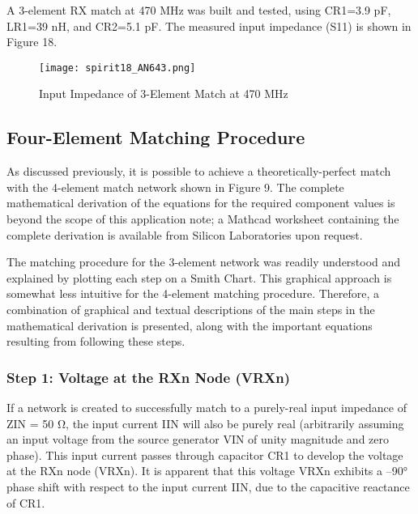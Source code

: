         A 3-element RX match at 470 MHz was built and tested, using CR1=3.9 pF, LR1=39 nH, and 
        CR2=5.1 pF. The measured input impedance (S11) is shown in Figure 18.
        
        \begin{figure}[ht!] %
          \centering
          \texttt{[image: spirit18\_AN643.png]}
          \caption{Input Impedance of 3-Element Match at 470 MHz \cite[s.~14]{AN643SiliconLabs}}
          \label{EXP001:fig_spirit18}
        \end{figure}
        
    \subsection{Four-Element Matching Procedure}
      As discussed previously, it is possible to achieve a theoretically-perfect match with the 
      4-element match network shown in Figure 9. The complete mathematical derivation of the 
      equations for the required component values is beyond the scope of this application note; a 
      Mathcad worksheet containing the complete derivation is available from Silicon Laboratories 
      upon request.
      
      The matching procedure for the 3-element network was readily understood and explained by 
      plotting each step on a Smith Chart. This graphical approach is somewhat less intuitive for 
      the 4-element matching procedure. Therefore, a combination of graphical and textual 
      descriptions of the main steps in the mathematical derivation is presented, along with the 
      important equations resulting from following these steps.
       
      \subsubsection{Step 1: Voltage at the RXn Node (VRXn)}
        If a network is created to successfully match to a purely-real input impedance of ZIN = 50 
        Ω, the input current IIN will also be purely real (arbitrarily assuming an input voltage 
        from the source generator VIN of unity magnitude and zero phase). This input current passes 
        through capacitor CR1 to develop the voltage at the RXn node (VRXn). It is apparent that 
        this voltage VRXn exhibits a –90° phase shift with respect to the input current IIN, due to 
        the capacitive reactance of CR1.
        
